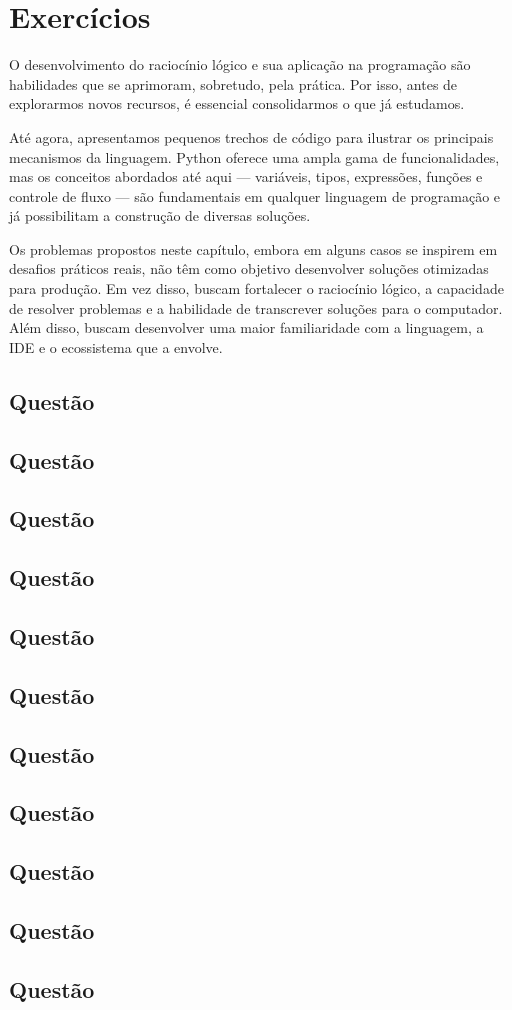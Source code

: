 \chapter{Exercícios}

O desenvolvimento do raciocínio lógico e sua aplicação na programação são habilidades que se aprimoram, sobretudo, pela
prática.
Por isso, antes de explorarmos novos recursos, é essencial consolidarmos o que já estudamos.

Até agora, apresentamos pequenos trechos de código para ilustrar os principais mecanismos da linguagem.
Python oferece uma ampla gama de funcionalidades, mas os conceitos abordados até aqui --- variáveis, tipos, expressões,
funções e controle de fluxo --- são fundamentais em qualquer linguagem de programação e já possibilitam a construção de
diversas soluções.

Os problemas propostos neste capítulo, embora em alguns casos se inspirem em desafios práticos reais, não têm como
objetivo desenvolver soluções otimizadas para produção.
Em vez disso, buscam fortalecer o raciocínio lógico, a capacidade de resolver problemas e a habilidade de transcrever
soluções para o computador.
Além disso, buscam desenvolver uma maior familiaridade com a linguagem, a IDE e o ecossistema que a envolve.

\newcommand{\questao}[2][]{\addtocounter{section}{1}\section*{Questão \thesection} }

\newcommand{\expath}{capitulos/ex/}

\questao[\expath]{desvio_padrao}
\questao[\expath]{login}
\questao[\expath]{separa_pares_impares}
\questao[\expath]{seno}
\questao[\expath]{produto_mais_vendido}
\questao[\expath]{alunos_aprovados}
\questao[\expath]{media_movel}
\questao[\expath]{ordena}
\questao[\expath]{procura}
\questao[\expath]{tictactoe}
\questao[\expath]{tictactoe2}
